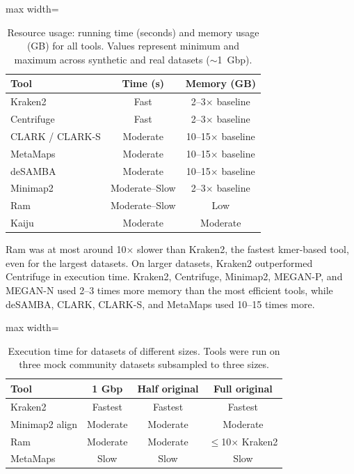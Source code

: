 \documentclass{article}
\begin{document}
\begin{table}[htbp]
\centering
\caption{Resource usage: running time (seconds) and memory usage (GB) for all tools. Values represent minimum and maximum across synthetic and real datasets ($\sim$1~Gbp).}
\label{tab:resources}
\begin{adjustbox}{max width=\textwidth}
\begin{tabular}{lcc}
\toprule
Tool & Time (s) & Memory (GB) \\
\midrule
Kraken2 & Fast & 2--3$\times$ baseline \\
Centrifuge & Fast & 2--3$\times$ baseline \\
CLARK / CLARK-S & Moderate & 10--15$\times$ baseline \\
MetaMaps & Moderate & 10--15$\times$ baseline \\
deSAMBA & Moderate & 10--15$\times$ baseline \\
Minimap2 & Moderate--Slow & 2--3$\times$ baseline \\
Ram & Moderate--Slow & Low \\
Kaiju & Moderate & Moderate \\
\bottomrule
\end{tabular}
\end{adjustbox}
\end{table}

Ram was at most around 10$\times$ slower than Kraken2, the fastest kmer-based tool, even for the largest datasets. On larger datasets, Kraken2 outperformed Centrifuge in execution time. Kraken2, Centrifuge, Minimap2, MEGAN-P, and MEGAN-N used 2--3 times more memory than the most efficient tools, while deSAMBA, CLARK, CLARK-S, and MetaMaps used 10--15 times more.

\begin{table}[htbp]
\centering
\caption{Execution time for datasets of different sizes. Tools were run on three mock community datasets subsampled to three sizes.}
\label{tab:scalability}
\begin{adjustbox}{max width=\textwidth}
\begin{tabular}{lccc}
\toprule
Tool & 1 Gbp & Half original & Full original \\
\midrule
Kraken2 & Fastest & Fastest & Fastest \\
Minimap2 align & Moderate & Moderate & Moderate \\
Ram & Moderate & Moderate & $\leq$10$\times$ Kraken2 \\
MetaMaps & Slow & Slow & Slow \\
\bottomrule
\end{tabular}
\end{adjustbox}
\end{table}
\end{document}
